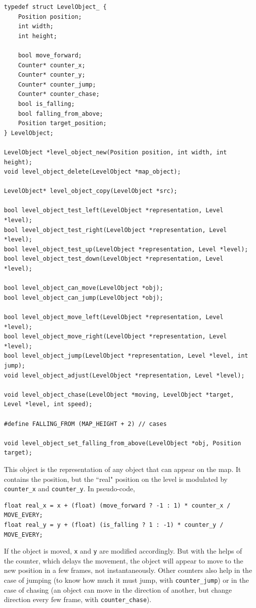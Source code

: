 \documentclass[12pt,a4paper]{article}
\newcommand{\cc}[1]{\texttt{#1}}
\begin{document}
\begin{verbatim}
typedef struct LevelObject_ {
    Position position;
    int width;
    int height;

    bool move_forward;
    Counter* counter_x;
    Counter* counter_y;
    Counter* counter_jump;
    Counter* counter_chase;    
    bool is_falling;
    bool falling_from_above;
    Position target_position;
} LevelObject;

LevelObject *level_object_new(Position position, int width, int height);
void level_object_delete(LevelObject *map_object);

LevelObject* level_object_copy(LevelObject *src);

bool level_object_test_left(LevelObject *representation, Level *level);
bool level_object_test_right(LevelObject *representation, Level *level);
bool level_object_test_up(LevelObject *representation, Level *level);
bool level_object_test_down(LevelObject *representation, Level *level);

bool level_object_can_move(LevelObject *obj);
bool level_object_can_jump(LevelObject *obj);

bool level_object_move_left(LevelObject *representation, Level *level);
bool level_object_move_right(LevelObject *representation, Level *level);
bool level_object_jump(LevelObject *representation, Level *level, int jump);
void level_object_adjust(LevelObject *representation, Level *level);

void level_object_chase(LevelObject *moving, LevelObject *target, Level *level, int speed);

#define FALLING_FROM (MAP_HEIGHT + 2) // cases

void level_object_set_falling_from_above(LevelObject *obj, Position target);
\end{verbatim}

This object is the representation of any object that can appear on the map. It contains the position, but the ``real" position on the level is modulated by \cc{counter_x} and \cc{counter_y}. In pseudo-code,\begin{verbatim}
float real_x = x + (float) (move_forward ? -1 : 1) * counter_x / MOVE_EVERY;
float real_y = y + (float) (is_falling ? 1 : -1) * counter_y / MOVE_EVERY;
\end{verbatim}

If the object is moved, \cc{x} and \cc{y} are modified accordingly. But with the helps of the counter, which delays the movement, the object will appear to move to the new position in a few frames, not instantaneously. Other counters also help in the case of jumping (to know how much it must jump, with \cc{counter_jump}) or in the case of chasing (an object can move in the direction of another, but change direction every few frame, with \cc{counter_chase}).
\end{document}

